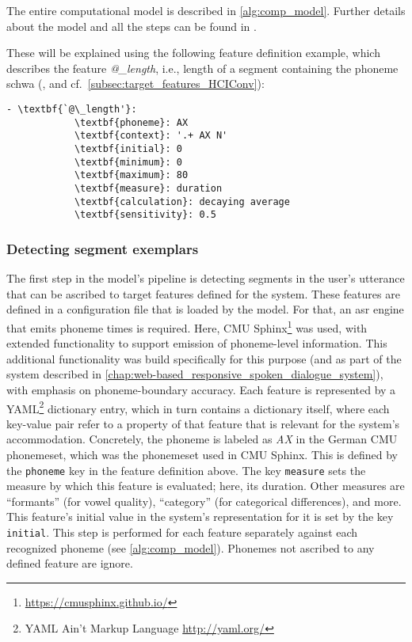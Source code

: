 


The entire computational model is described in \cref{alg:comp_model}.
Further details about the model and all the steps can be found in \citet{Raveh2017Interspeech}.

These will be explained using the following feature definition example, which describes the feature \textit{@\_length}, i.e., length of a segment containing the phoneme schwa (\textipa{[@]}, and cf.\ \cref{subsec:target_features_HCIConv}):
%
\begin{Verbatim}[tabsize=4, commandchars=\\\{\}]
	- \textbf{`@\_length'}:
			\textbf{phoneme}: AX
			\textbf{context}: '.+ AX N'
			\textbf{initial}: 0
			\textbf{minimum}: 0 
			\textbf{maximum}: 80
			\textbf{measure}: duration
			\textbf{calculation}: decaying average
			\textbf{sensitivity}: 0.5
\end{Verbatim}

\subsubsection{Detecting segment exemplars}
\label{subsubsec:detecting segment exemplars}

The first step in the model's pipeline is detecting segments in the user's utterance that can be ascribed to target features defined for the system.
These features are defined in a configuration file that is loaded by the model.
For that, an \ac{asr} engine that emits phoneme times is required.
Here, CMU Sphinx\footnote{\url{https://cmusphinx.github.io/}} was used, with extended functionality to support emission of phoneme-level information.
This additional functionality was build specifically for this purpose (and as part of the system described in \cref{chap:web-based_responsive_spoken_dialogue_system}), with emphasis on phoneme-boundary accuracy.
Each feature is represented by a YAML\footnote{YAML Ain't Markup Language \url{http://yaml.org/}} dictionary entry, which in turn contains a dictionary itself, where each key-value pair refer to a property of that feature that is relevant for the system's accommodation.
Concretely, the phoneme \textipa{[@]} is labeled as \textit{AX} in the German CMU phonemeset, which was the phonemeset used in CMU Sphinx.
This is defined by the \texttt{phoneme} key in the feature definition above.
The key \texttt{measure} sets the measure by which this feature is evaluated; here, its duration.
Other measures are \enquote{formants} (for vowel quality), \enquote{category} (for categorical differences), and more.
This feature's initial value in the system's representation for it is set by the key \texttt{initial}.
This step is performed for each feature separately against each recognized phoneme (see \cref{alg:comp_model}).
Phonemes not ascribed to any defined feature are ignore.

